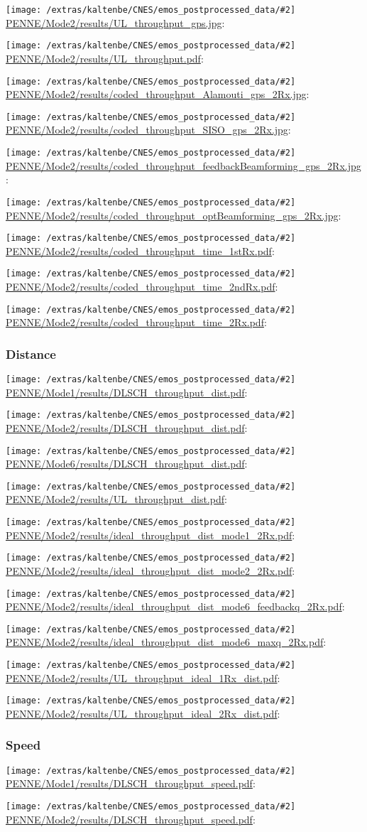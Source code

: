 \documentclass[a4paper,10pt]{article}
\newcommand{\printfile}[2][]{
 \begin{minipage}{8cm}
  \centering
  \texttt{[image: /extras/kaltenbe/CNES/emos\_postprocessed\_data/\#2]}
  \url{#2}: #1

 \end{minipage}
}
\begin{document}
\printfile{PENNE/Mode2/results/UL_throughput_gps.jpg}
\printfile{PENNE/Mode2/results/UL_throughput.pdf}

\printfile{PENNE/Mode2/results/coded_throughput_Alamouti_gps_2Rx.jpg}
\printfile{PENNE/Mode2/results/coded_throughput_SISO_gps_2Rx.jpg}

\printfile{PENNE/Mode2/results/coded_throughput_feedbackBeamforming_gps_2Rx.jpg}
\printfile{PENNE/Mode2/results/coded_throughput_optBeamforming_gps_2Rx.jpg}

\printfile{PENNE/Mode2/results/coded_throughput_time_1stRx.pdf}
\printfile{PENNE/Mode2/results/coded_throughput_time_2ndRx.pdf}

\printfile{PENNE/Mode2/results/coded_throughput_time_2Rx.pdf}


\subsubsection{Distance}

\printfile{PENNE/Mode1/results/DLSCH_throughput_dist.pdf}
\printfile{PENNE/Mode2/results/DLSCH_throughput_dist.pdf}

\printfile{PENNE/Mode6/results/DLSCH_throughput_dist.pdf}
\printfile{PENNE/Mode2/results/UL_throughput_dist.pdf}


\printfile{PENNE/Mode2/results/ideal_throughput_dist_mode1_2Rx.pdf}
%
\printfile{PENNE/Mode2/results/ideal_throughput_dist_mode2_2Rx.pdf}

\printfile{PENNE/Mode2/results/ideal_throughput_dist_mode6_feedbackq_2Rx.pdf}
%
\printfile{PENNE/Mode2/results/ideal_throughput_dist_mode6_maxq_2Rx.pdf}

\printfile{PENNE/Mode2/results/UL_throughput_ideal_1Rx_dist.pdf}
\printfile{PENNE/Mode2/results/UL_throughput_ideal_2Rx_dist.pdf}

\subsubsection{Speed}

\printfile{PENNE/Mode1/results/DLSCH_throughput_speed.pdf}
\printfile{PENNE/Mode2/results/DLSCH_throughput_speed.pdf}
\end{document}
